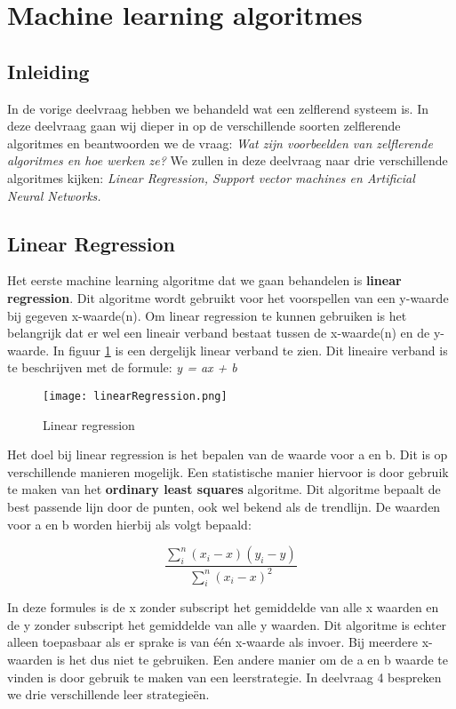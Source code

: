 \section{Machine learning algoritmes}
\label{chapter:MLA}

\subsection{Inleiding}
In de vorige deelvraag hebben we behandeld wat een zelflerend systeem is. In deze deelvraag gaan wij dieper in op de verschillende soorten zelflerende algoritmes en beantwoorden we de vraag: \textit{Wat zijn voorbeelden van zelflerende algoritmes en hoe werken ze?} We zullen in deze deelvraag naar drie verschillende algoritmes kijken: \textit{Linear Regression, Support vector machines en Artificial Neural Networks.} \cite{SunilRay} 

\subsection{Linear Regression}
Het eerste machine learning algoritme dat we gaan behandelen is \textbf{linear regression}. Dit algoritme wordt gebruikt voor het voorspellen van een y-waarde bij gegeven x-waarde(n). Om linear regression te kunnen gebruiken is het belangrijk dat er wel een lineair verband bestaat tussen de x-waarde(n) en de y-waarde. In figuur \ref{fig:LinearRegression1} is een dergelijk linear verband te zien. 
Dit lineaire verband is te beschrijven met de formule:
\textit{y = ax + b}

\begin{figure}[h]
  \centering
    \texttt{[image: linearRegression.png]}
  \caption{Linear regression}
  \label{fig:LinearRegression1}
\end{figure}

Het doel bij linear regression is het bepalen van de waarde voor a en b. Dit is op verschillende manieren mogelijk. Een statistische manier hiervoor is door gebruik te maken van het \textbf{ordinary least squares} algoritme. Dit algoritme bepaalt de best passende lijn door de punten, ook wel bekend als de trendlijn. De waarden voor a en b worden hierbij als volgt bepaald:

\[
	\frac{\sum_i^n(x_{i} - x)(y_{i} - y)}{\sum_i^n(x_{i} - x)^{2}}
\]

In deze formules is de x zonder subscript het gemiddelde van alle x waarden en de y zonder subscript het gemiddelde van alle y waarden. 
Dit algoritme is echter alleen toepasbaar als er sprake is van één x-waarde als invoer. Bij meerdere x-waarden is het dus niet te gebruiken. Een andere manier om de a en b waarde te vinden is door gebruik te maken van een leerstrategie. In deelvraag 4 bespreken we drie verschillende leer strategieën.

